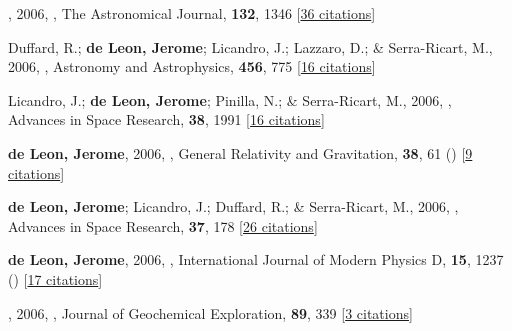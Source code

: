 \item[{\color{numcolor}\scriptsize23}] , 2006, , The Astronomical Journal, \textbf{132}, 1346 [\href{https://ui.adsabs.harvard.edu/abs/2006AJ....132.1346C}{36 citations}]

\item[{\color{numcolor}\scriptsize22}] Duffard, R.; \textbf{de Leon, Jerome}; Licandro, J.; Lazzaro, D.; \& Serra-Ricart, M., 2006, , Astronomy and Astrophysics, \textbf{456}, 775 [\href{https://ui.adsabs.harvard.edu/abs/2006A&A...456..775D}{16 citations}]

\item[{\color{numcolor}\scriptsize21}] Licandro, J.; \textbf{de Leon, Jerome}; Pinilla, N.; \& Serra-Ricart, M., 2006, , Advances in Space Research, \textbf{38}, 1991 [\href{https://ui.adsabs.harvard.edu/abs/2006AdSpR..38.1991L}{16 citations}]

\item[{\color{numcolor}\scriptsize20}] \textbf{de Leon, Jerome}, 2006, , General Relativity and Gravitation, \textbf{38}, 61 () [\href{https://ui.adsabs.harvard.edu/abs/2006GReGr..38...61D}{9 citations}]

\item[{\color{numcolor}\scriptsize19}] \textbf{de Leon, Jerome}; Licandro, J.; Duffard, R.; \& Serra-Ricart, M., 2006, , Advances in Space Research, \textbf{37}, 178 [\href{https://ui.adsabs.harvard.edu/abs/2006AdSpR..37..178D}{26 citations}]

\item[{\color{numcolor}\scriptsize18}] \textbf{de Leon, Jerome}, 2006, , International Journal of Modern Physics D, \textbf{15}, 1237 () [\href{https://ui.adsabs.harvard.edu/abs/2006IJMPD..15.1237D}{17 citations}]

\item[{\color{numcolor}\scriptsize17}] , 2006, , Journal of Geochemical Exploration, \textbf{89}, 339 [\href{https://ui.adsabs.harvard.edu/abs/2006JCExp..89..339P}{3 citations}]

